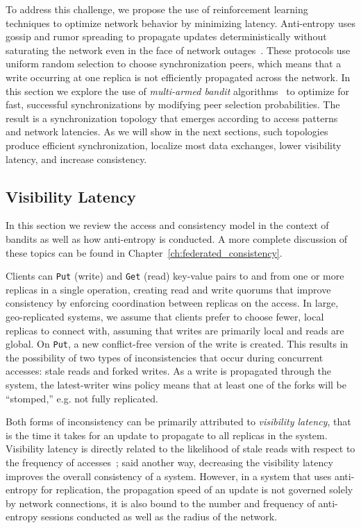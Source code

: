 To address this challenge, we propose the use of reinforcement learning techniques to optimize network behavior by minimizing latency.
Anti-entropy uses gossip and rumor spreading to propagate updates
deterministically without saturating the
network even in the face of network
outages~\cite{gossip_protocols,rumor_spreading,rumor_spreading_dynamics}.
These protocols use uniform random selection to choose synchronization peers,
which means that a write occurring at one replica is not efficiently
propagated across the network.
In this section we explore the use of \textit{multi-armed bandit}
algorithms~\cite{epoch_greedy_mab,contextual_bandits} to optimize
for fast, successful synchronizations by modifying peer selection
probabilities.
The result is a synchronization topology that emerges according to access
patterns and network latencies.
As we will show in the next sections, such topologies produce efficient synchronization,
localize most data exchanges, lower visibility latency, and increase
consistency.

\subsection{Visibility Latency}
\label{ch06_visbility}

In this section we review the access and consistency model in the context of bandits as well as how anti-entropy is conducted.
A more complete discussion of these topics can be found in Chapter~\ref{ch:federated_consistency}.

Clients can \texttt{Put} (write) and \texttt{Get} (read) key-value pairs to
and from one or more replicas in a single operation, creating read and write quorums that improve consistency by enforcing coordination between replicas on the access.
In large, geo-replicated systems, we assume that clients prefer to choose fewer, local replicas to connect with, assuming that writes are primarily local and reads are global.
On \texttt{Put}, a new conflict-free version of the write is created.
This results in the possibility of two types of inconsistencies that occur during concurrent accesses: stale reads and forked writes.
As a write is propagated through the system, the latest-writer wins policy means that at least one of the forks will be ``stomped,'' e.g. not fully replicated.

Both forms of inconsistency can be primarily attributed to \emph{visibility
latency}, that is the time it takes for an update to propagate to all
replicas in the system.
Visibility latency is directly related to the likelihood of stale reads with
respect to the frequency of accesses~\cite{quantifying_pbs}; said
another way, decreasing the visibility latency improves the overall
consistency of a system.
However, in a system that uses anti-entropy for replication, the propagation
speed of an update is not governed solely by network connections, it is also
bound to the number and frequency of anti-entropy sessions conducted as well
as the radius of the network.

